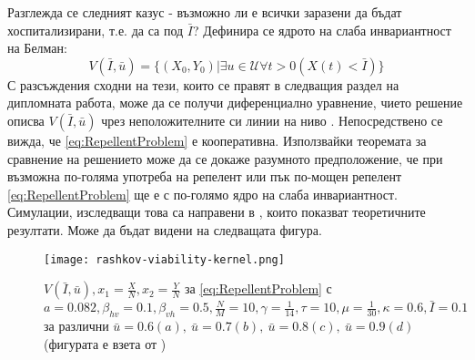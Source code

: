 Разглежда се следният казус - възможно ли е всички заразени да бъдат хоспитализирани, т.е. да са под $\bar{I}$?
Дефинира се ядрото на слаба инвариантност на Белман:
\begin{equation}
  \label{eq:BasicViability}
  V(\bar{I}, \bar{u}) = \{(X_0, Y_0) \vert \exists{u \in \mathscr{U}}\forall t>0 (X(t) < \bar{I})\}
\end{equation}
С разсъждения сходни на тези, които се правят в следващия раздел на дипломната работа, може да се получи диференциално уравнение, чието решение описва $V(\bar{I}, \bar{u})$ чрез неположителните си линии на ниво \cite{Zidani2013}.
Непосредствено се вижда, че \eqref{eq:RepellentProblem} е кооперативна.
Използвайки теоремата за сравнение на решението може да се докаже разумното предположение, че при възможна по-голяма употреба на репелент или пък по-мощен репелент \eqref{eq:RepellentProblem} ще е с по-голямо ядро на слаба инвариантност.
Симулации, изследващи това са направени в \cite{Rashkov2022}, които показват теоретичните резултати. Може да бъдат видени на следващата фигура.

\begin{figure}[H]
  \centering
  \texttt{[image: rashkov-viability-kernel.png]}
  \caption{$V(\bar{I}, \bar{u}), x_1 = \frac{X}{N}, x_2 = \frac{Y}{N}$ за \eqref{eq:RepellentProblem} с $a=0.082, \beta_{hv}=0.1, \beta_{vh}=0.5, \frac{N}{M} = 10, \gamma = \frac{1}{14}, \tau = 10, \mu=\frac{1}{30}, \kappa=0.6, \bar{I}=0.1$ за различни $\bar{u}=0.6 (a),~ \bar{u}=0.7 (b),~ \bar{u}=0.8 (c),~ \bar{u}=0.9 (d)$ (фигурата е взета от \cite{Rashkov2022})}
  \label{fig:RashkovResults}
\end{figure}
